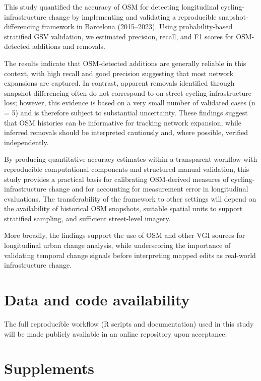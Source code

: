\documentclass[
]{article}
\begin{document}
This study quantified the accuracy of OSM for detecting longitudinal
cycling-infrastructure change by implementing and validating a
reproducible snapshot-differencing framework in Barcelona (2015--2023).
Using probability-based stratified GSV validation, we estimated
precision, recall, and F1 scores for OSM-detected additions and
removals.

The results indicate that OSM-detected additions are generally reliable
\color{blue}in this context, with high recall and good precision
suggesting that most network expansions are captured. In contrast,
apparent removals identified through snapshot differencing often do not
correspond to on-street cycling-infrastructure loss; however, this
evidence is based on a very small number of validated cases (n = 5) and
is therefore subject to substantial uncertainty. These findings suggest
that OSM histories can be informative for tracking network expansion,
while inferred removals should be interpreted cautiously and, where
possible, verified independently.\color{black}

By producing quantitative accuracy estimates within a transparent
\color{blue}workflow with reproducible computational components and
structured manual validation\color{black}, this study provides a
practical basis for calibrating OSM-derived measures of
cycling-infrastructure change and for accounting for measurement error
in longitudinal evaluations. \color{blue}The transferability of the
framework to other settings will depend on the availability of
historical OSM snapshots, suitable spatial units to support stratified
sampling, and sufficient street-level imagery.\color{black}

More broadly, the findings support the use of OSM and other VGI sources
for longitudinal urban change analysis, while underscoring the
importance of validating temporal change signals before interpreting
mapped edits as real-world infrastructure change.

\section*{Data and code availability}\label{data-and-code-availability}

The full reproducible workflow (R scripts and documentation) used in
this study will be made publicly available in an online repository upon
acceptance.

\section*{Supplements}\label{supplements}
\end{document}
